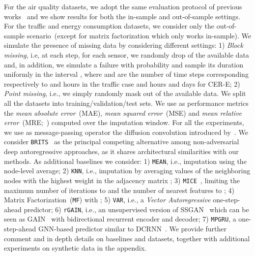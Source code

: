 \documentclass{article} \usepackage{iclr2022_conference,times}
\begin{document}
For the air quality datasets, we adopt the same evaluation protocol of previous works~\citep{yi2016stmvl, cao2018brits} and we show results for both the in-sample and out-of-sample settings. For the traffic and energy consumption datasets, we consider only the out-of-sample scenario~(except for matrix factorization which only works in-sample). We simulate the presence of missing data by considering  different settings: 1) \textit{Block missing}, i.e, at each step, for each sensor, we randomly drop  of the available data and, in addition, we simulate a failure with probability  and sample its duration uniformly in the interval , where  and  are the number of time steps corresponding respectively to  and  hours in the traffic case and  hours and  days for CER-E; 2) \textit{Point missing}, i.e., we simply randomly mask out  of the available data. We split all the datasets into training/validation/test sets. We use as performance metrics the \emph{mean absolute error}~(MAE), \emph{mean squared error}~(MSE) and \emph{mean relative error}~(MRE;~\citealp{cao2018brits}) computed over the imputation window.
For all the experiments, we use as message-passing operator the diffusion convolution introduced by~\citet{atwood2016diffusion}. We consider \texttt{BRITS}~\citep{cao2018brits} as the principal competing alternative among non-adversarial deep autoregressive approaches, as it shares architectural similarities with our methods.  As additional baselines we consider: 1) \texttt{MEAN}, i.e., imputation using the node-level average; 2) \texttt{KNN}, i.e., imputation by averaging values of the  neighboring nodes with the highest weight in the adjacency matrix ; 3) \texttt{MICE}~\citep{white2011multiple}, limiting the maximum number of iterations to  and the number of nearest features to ; 4) Matrix Factorization~(\texttt{MF}) with ; 5) \texttt{VAR}, i.e., a \textit{Vector Autoregressive} one-step-ahead predictor; 6) \texttt{rGAIN}, i.e., an unsupervised version of SSGAN~\citep{miao2021generative} which can be seen as GAIN~\citep{yoon2018gain} with bidirectional recurrent encoder and decoder; 7) \texttt{MPGRU}, a one-step-ahead GNN-based predictor similar to DCRNN~\citep{li2018diffusion}. We provide further comment and in depth details on baselines and datasets, together with additional experiments on synthetic data in the appendix.
\end{document}
